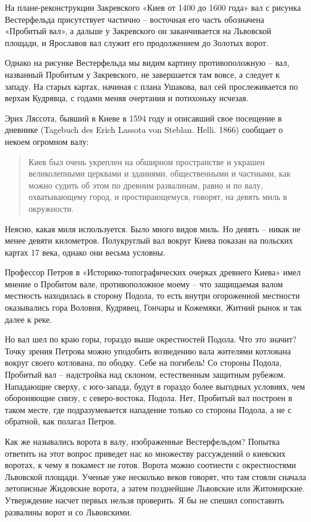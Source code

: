На плане-реконструкции Закревского «Киев от 1400 до 1600 года» вал с рисунка Вестерфельда присутствует частично – восточная его часть обозначена «Пробитый вал», а дальше у Закревского он заканчивается на Львовской площади, и Ярославов вал служит его продолжением до Золотых ворот. 

Однако на рисунке Вестерфельда мы видим картину противоположную – вал, названный Пробитым у Закревского, не завершается там вовсе, а следует к западу. На старых картах, начиная с плана Ушакова, вал сей прослеживается по верхам Кудрявца, с годами меняя очертания и потихоньку исчезая.

Эрих Ляссота, бывший в Киеве в 1594 году и описавший свое посещение в дневнике (Tagebuch des Erich Lassota von Steblan. Helli. 1866) сообщает о некоем огромном валу:

\begin{quotation}
Киев был очень укреплен на обширном пространстве и украшен великолепными церквами и зданиями, общественными и частными, как можно судить об этом по древним развалинам, равно и по валу, охватывающему город, и простирающемуся, говорят, на девять миль в окружности.
\end{quotation}

Неясно, какая миля используется. Было много видов миль. Но девять – никак не менее девяти километров. Полукруглый вал вокруг Киева показан на польских картах 17 века, однако они весьма условны.

Профессор Петров в «Историко-топографических оче\-рках древнего Киева»\cite{petrov01} имел мнение о Пробитом вале, противоположное моему – что защищаемая валом местность находилась в сторону Подола, то есть внутри огороженной местности оказывались гора Воловня, Кудрявец, Гончары и Кожемяки, Житний рынок и так далее к реке. 

Но вал шел по краю горы, гораздо выше окрестностей Подола. Что это значит? Точку зрения Петрова можно уподобить возведению вала жителями котлована вокруг своего котлована, по ободку. Себе на погибель! Со стороны Подола, Пробитый вал – надстройка над склоном, естественным защитным рубежом. Нападающие сверху, с юго-запада, будут в гораздо более выгодных условиях, чем обороняющие снизу, с северо-востока, Подола. Нет, Пробитый вал построен в таком месте, где подразумевается нападение только со стороны Подола, а не с обратной, как полагал Петров.
 
Как же назывались ворота в валу, изображенные Вестерфельдом? Попытка ответить на этот вопрос приведет нас ко множеству рассуждений о киевских воротах, к чему я покамест не готов. Ворота можно соотнести с окрестностями Львовской площади. Ученые уже несколько веков говорят, что там стояли сначала летописные Жидовские ворота, а затем позднейшие Львовские или Житомирские. Утверждение насчет первых нельзя проверить. Я бы не спешил сопоставить развалины ворот и со Львовскими.

